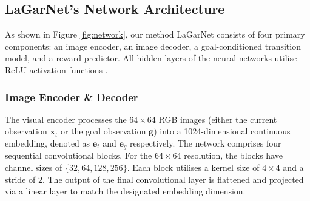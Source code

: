 \documentclass[journal]{IEEEtran}
\newcommand{\addinfo}[1]{\textcolor{myPurple}{#1}}
\begin{document}

    
    
    
\addinfo{\subsection{LaGarNet's Network Architecture} \label{sec:architecture}}

\addinfo{As shown in Figure \ref{fig:network}, our method LaGarNet consists of four primary components: an image encoder, an image decoder, a goal-conditioned transition model, and a reward predictor. All hidden layers of the neural networks utilise ReLU activation functions \cite{fukushima1975cognitron}.}

\subsubsection{Image Encoder \& Decoder} \addinfo{The visual encoder processes the $64 \times 64$ RGB images (either the current observation $\bm{x}_t$ or the goal observation $\bm{g}$) into a 1024-dimensional continuous embedding, denoted as $\bm{e}_t$ and $\bm{e}_g$ respectively. The network comprises four sequential convolutional blocks. For the $64 \times 64$ resolution, the blocks have channel sizes of $\{32, 64, 128, 256\}$. Each block utilises a kernel size of $4 \times 4$ and a stride of $2$. The output of the final convolutional layer is flattened and projected via a linear layer to match the designated embedding dimension.}
\end{document}
